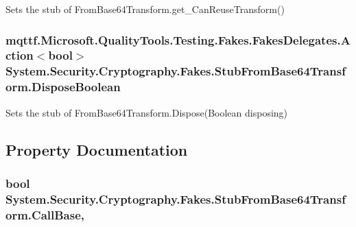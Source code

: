 Sets the stub of From\-Base64\-Transform.\-get\-\_\-\-Can\-Reuse\-Transform()

\hypertarget{class_system_1_1_security_1_1_cryptography_1_1_fakes_1_1_stub_from_base64_transform_aff5078cc56792c1420c8f075f2c8564c}{
\subsubsection[{Dispose\-Boolean}]{\setlength{\rightskip}{0pt plus 5cm}mqttf.\-Microsoft.\-Quality\-Tools.\-Testing.\-Fakes.\-Fakes\-Delegates.\-Action$<$bool$>$ System.\-Security.\-Cryptography.\-Fakes.\-Stub\-From\-Base64\-Transform.\-Dispose\-Boolean}}\label{class_system_1_1_security_1_1_cryptography_1_1_fakes_1_1_stub_from_base64_transform_aff5078cc56792c1420c8f075f2c8564c}


Sets the stub of From\-Base64\-Transform.\-Dispose(\-Boolean disposing)



\subsection{Property Documentation}
\hypertarget{class_system_1_1_security_1_1_cryptography_1_1_fakes_1_1_stub_from_base64_transform_a1bf4745829f3e2d8bd45980d8aab4b80}{
\subsubsection[{Call\-Base}]{\setlength{\rightskip}{0pt plus 5cm}bool System.\-Security.\-Cryptography.\-Fakes.\-Stub\-From\-Base64\-Transform.\-Call\-Base\hspace{0.3cm}{\ttfamily [get]}, {\ttfamily [set]}}}\label{class_system_1_1_security_1_1_cryptography_1_1_fakes_1_1_stub_from_base64_transform_a1bf4745829f3e2d8bd45980d8aab4b80}


